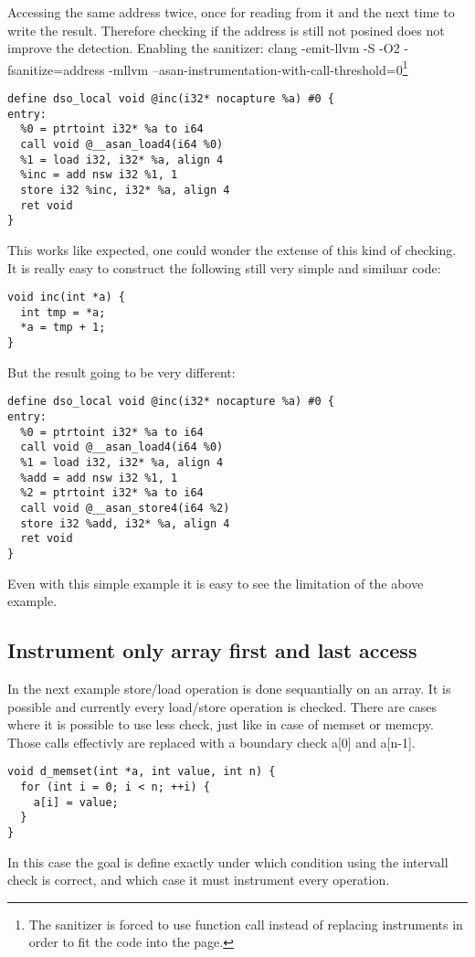\documentclass[letterpaper, 10 pt, conference]{IEEEtran}  %
\begin{document}
Accessing the same address twice, once for reading from it and the next time to write the result. Therefore checking if the address is still not posined does not improve the detection. 
Enabling the sanitizer: clang -emit-llvm -S -O2 -fsanitize=address -mllvm --asan-instrumentation-with-call-threshold=0\footnote{The sanitizer is forced to use function call instead of replacing instruments in order to fit the code into the page.}

\begin{verbatim}
define dso_local void @inc(i32* nocapture %a) #0 {
entry:
  %0 = ptrtoint i32* %a to i64
  call void @__asan_load4(i64 %0)
  %1 = load i32, i32* %a, align 4
  %inc = add nsw i32 %1, 1
  store i32 %inc, i32* %a, align 4
  ret void
}
\end{verbatim}

This works like expected, one could wonder the extense of this kind of checking. It is really easy to construct the following still very simple and similuar code:

\begin{verbatim}
void inc(int *a) {
  int tmp = *a;
  *a = tmp + 1;
}
\end{verbatim}

But the result going to be very different:

\begin{verbatim}
define dso_local void @inc(i32* nocapture %a) #0 {
entry:
  %0 = ptrtoint i32* %a to i64
  call void @__asan_load4(i64 %0)
  %1 = load i32, i32* %a, align 4
  %add = add nsw i32 %1, 1
  %2 = ptrtoint i32* %a to i64
  call void @__asan_store4(i64 %2)
  store i32 %add, i32* %a, align 4
  ret void
}
\end{verbatim}

Even with this simple example it is easy to see the limitation of the above example.

\subsection{Instrument only array first and last access}

In the next example store/load operation is done sequantially on an array. It is possible and currently every load/store operation is checked. There are cases where it is possible to use less check, just like in case of memset or memcpy. Those calls effectivly are replaced with a boundary check a[0] and a[n-1].
\begin{verbatim}
void d_memset(int *a, int value, int n) {
  for (int i = 0; i < n; ++i) {
    a[i] = value;
  }
}
\end{verbatim}
In this case the goal is define exactly under which condition using the intervall check is correct, and which case it must instrument every operation.
\end{document}
